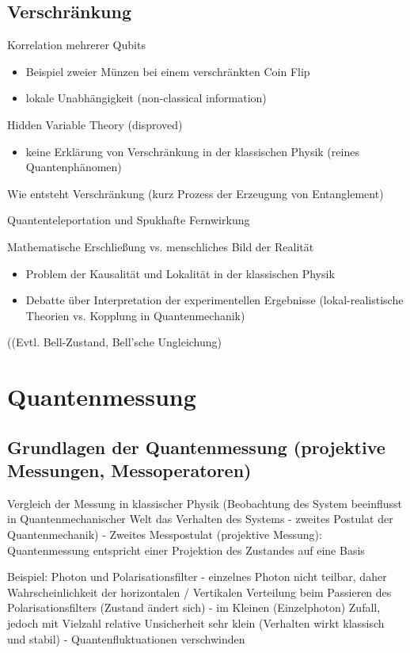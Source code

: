 \subsection{Verschränkung }

Korrelation mehrerer Qubits
\begin{itemize}
    \item Beispiel zweier Münzen bei einem verschränkten Coin Flip
    \item lokale Unabhängigkeit (non-classical information)
\end{itemize}

Hidden Variable Theory (disproved)
\begin{itemize}
    \item keine Erklärung von Verschränkung in der klassischen Physik (reines Quantenphänomen)
\end{itemize}

Wie entsteht Verschränkung (kurz Prozess der Erzeugung von Entanglement)

Quantenteleportation und Spukhafte Fernwirkung

Mathematische Erschließung vs. menschliches Bild der Realität
\begin{itemize}
    \item Problem der Kausalität und Lokalität in der klassischen Physik
    \item Debatte über Interpretation der experimentellen Ergebnisse (lokal-realistische Theorien vs. Kopplung in Quantenmechanik)
\end{itemize}

((Evtl. Bell-Zustand, Bell'sche Ungleichung)

\section{Quantenmessung }
\subsection{Grundlagen der Quantenmessung (projektive Messungen, Messoperatoren)}
Vergleich der Messung in klassischer Physik (Beobachtung des System beeinflusst in Quantenmechanischer Welt das Verhalten des Systems 
- zweites Postulat der Quantenmechanik)
- Zweites Messpostulat (projektive Messung): Quantenmessung entspricht einer Projektion des Zustandes auf eine Basis

Beispiel: Photon und Polarisationsfilter 
- einzelnes Photon nicht teilbar, daher Wahrscheinlichkeit der horizontalen / Vertikalen Verteilung beim Passieren des Polarisationsfilters (Zustand ändert sich)
- im Kleinen (Einzelphoton) Zufall, jedoch mit Vielzahl relative Unsicherheit sehr klein (Verhalten wirkt klassisch und stabil) - Quantenfluktuationen verschwinden

